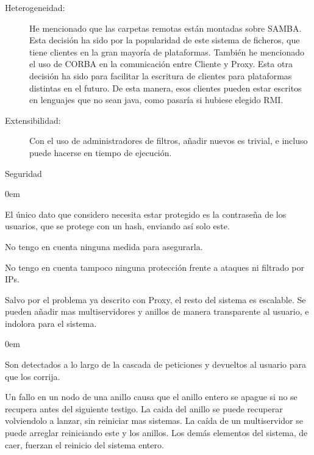 \documentclass{article}
\begin{document}
\begin{flushleft}
\begin{description}
		\item[Heterogeneidad:] He mencionado que las carpetas remotas están montadas sobre SAMBA. Esta decisión ha sido por la popularidad de este sistema de ficheros, que tiene clientes en la gran mayoría de plataformas. También he mencionado el uso de CORBA en la comunicación entre Cliente y Proxy. Esta otra decisión ha sido para facilitar la escritura de clientes para plataformas distintas en el futuro. De esta manera, esos clientes pueden estar escritos en lenguajes que no sean java, como pasaría si hubiese elegido RMI.
		\item[Extensibilidad:] Con el uso de administradores de filtros, añadir nuevos es trivial, e incluso puede hacerse en tiempo de ejecución.
		\item[Seguridad] 
			\end{description}
			\begin{description}
				\addtolength{\itemindent}{1cm}
				\itemsep0em 
					\item[Confidencialidad:] El único dato que considero necesita estar protegido es la contraseña de los usuarios, que se protege con un hash, enviando así solo este.
					\item[Integridad:] No tengo en cuenta ninguna medida para asegurarla.
					\item[Disponibilidad:] No tengo en cuenta tampoco ninguna protección frente a ataques ni filtrado por IPs.
			\end{description}
		\begin{description}
		\addtolength{\itemindent}{0.5cm}
		\item[Escalabilidad:] Salvo por el problema ya descrito con Proxy, el resto del sistema es escalable. Se pueden añadir mas multiservidores y anillos de manera transparente al usuario, e indolora para el sistema.
		\item[Gestion de fallos] 
		\end{description}
			\begin{description}
				\addtolength{\itemindent}{1cm}
				\itemsep0em 
					\item[Fallos de usuario:] Son detectados a lo largo de la cascada de peticiones y devueltos al usuario para que los corrija.
					\item[Fallos del sistema:] 
					\addtolength{\itemindent}{0.5cm}
					\item[Recuperacion y redundancia:] Un fallo en un nodo de una anillo causa que el anillo entero se apague si no se recupera antes del siguiente testigo. La caida del anillo se puede recuperar volviendolo a lanzar, sin reiniciar mas sistemas. La caída de un multiservidor se puede arreglar reiniciando este y los anillos. Los demás elementos del sistema, de caer, fuerzan el reinicio del sistema entero.

\end{description}
\end{flushleft}
\end{document}
